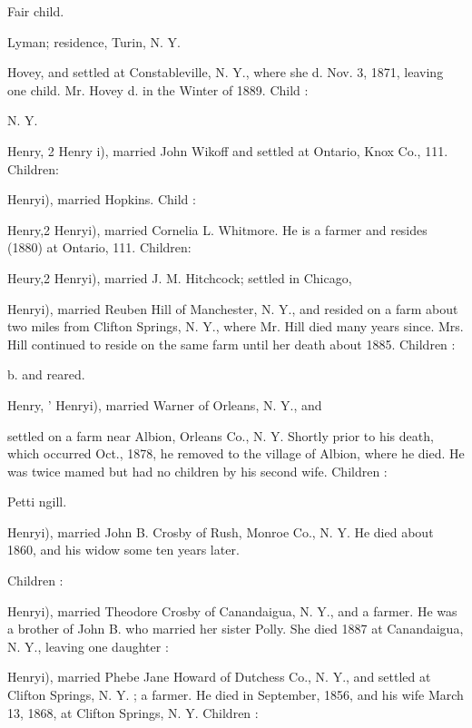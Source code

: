 \documentclass[oneside]{book}
\begin{document}
Fair child. 


Lyman; residence, Turin, N. Y. 


Hovey, and settled at Constableville, N. Y., where she d. 
Nov. 3, 1871, leaving one child. Mr. Hovey d. in the Winter 
of 1889. Child : 

N. Y. 

Henry, 2 Henry i), married John Wikoff and settled at Ontario, 
Knox Co., 111. Children: 






Henryi), married Hopkins. Child : 


Henry,2 Henryi), married Cornelia L. Whitmore. He is a farmer 
and resides (1880) at Ontario, 111. Children: 





Heury,2 Henryi), married J. M. Hitchcock; settled in Chicago, 



Henryi), married Reuben Hill of Manchester, N. Y., and resided 
on a farm about two miles from Clifton Springs, N. Y., where 
Mr. Hill died many years since. Mrs. Hill continued to reside 
on the same farm until her death about 1885. Children : 




b. and reared. 


Henry, ' Henryi), married Warner of Orleans, N. Y., and 

settled on a farm near Albion, Orleans Co., N. Y. Shortly prior 
to his death, which occurred Oct., 1878, he removed to the 
village of Albion, where he died. He was twice mamed but had 
no children by his second wife. Children : 



Petti ngill. 

Henryi), married John B. Crosby of Rush, Monroe Co., N. Y. 
He died about 1860, and his widow some ten years later. 

Children : 




Henryi), married Theodore Crosby of Canandaigua, N. Y., and 
a farmer. He was a brother of John B. who married her sister 
Polly. She died 1887 at Canandaigua, N. Y., leaving one 
daughter : 


Henryi), married Phebe Jane Howard of Dutchess Co., N. Y., 
and settled at Clifton Springs, N. Y. ; a farmer. He died in 
September, 1856, and his wife March 13, 1868, at Clifton Springs, 
N. Y. Children : 
\end{document}
